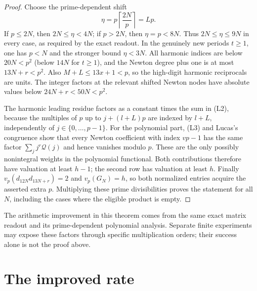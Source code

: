 \documentclass[11pt]{article}
\begin{document}
\begin{proof}
Choose the prime-dependent shift
\[
 \eta=p\left\lceil\frac{2N}{p}\right\rceil=Lp.
\]
If $p\le2N$, then $2N\le\eta<4N$; if $p>2N$, then
$\eta=p<8N$. Thus $2N\le\eta\le9N$ in every case, as required by
the exact readout. In the genuinely new periods $t\ge1$, one has
$p<N$ and the stronger bound $\eta<3N$.
All harmonic indices are below $20N<p^2$ (below $14N$ for $t\ge1$),
and the Newton degree plus one is at most $13N+r<p^2$.
Also $M+L\le13x+1<p$, so the high-digit harmonic reciprocals are units.
The integer factors at the relevant shifted Newton nodes have
absolute values below $24N+r<50N<p^2$.

The harmonic leading residue factors as a constant times the sum in
(L2), because the multiples of $p$ up to $j+(l+L)p$ are indexed by
$l+L$, independently of $j\in\{0,\ldots,p-1\}$.
For the polynomial part, (L3) and Lucas's congruence show that every
Newton coefficient with index $vp-1$ has the same factor
$\sum_jj^r\mathcal Q(j)$ and hence vanishes modulo $p$.
These are the only possibly nonintegral weights in the polynomial
functional. Both contributions therefore have valuation at least
$h-1$; the second row has valuation at least $h$.
Finally $v_p(d_{12N}d_{13N+r})=2$ and $v_p(G_N)=h$, so both
normalized entries acquire the asserted extra $p$.
Multiplying these prime divisibilities proves the statement for all $N$,
including the cases where the eligible product is empty.
\end{proof}

The arithmetic improvement in this theorem comes from the same exact
matrix readout and its prime-dependent polynomial analysis. Separate
finite experiments may expose these factors through specific
multiplication orders; their success alone is not the proof above.
\section{The improved rate}
\end{document}
